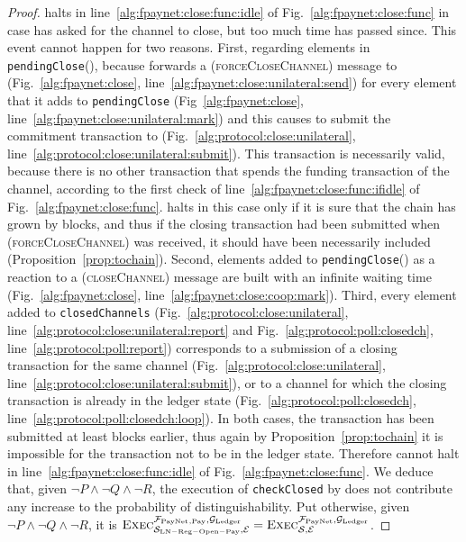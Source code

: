 \begin{proof}
  \fpaynet{} halts in line~\ref{alg:fpaynet:close:func:idle} of
  Fig.~\ref{alg:fpaynet:close:func} in case \environment{} has asked for the
  channel to close, but too much time has passed since. This event cannot happen
  for two reasons. First, regarding elements in \texttt{pendingClose}(\alice),
  because \fpaynet{} forwards a (\textsc{forceCloseChannel}) message to
  \simulator{} (Fig.~\ref{alg:fpaynet:close},
  line~\ref{alg:fpaynet:close:unilateral:send}) for every element that it adds
  to \texttt{pendingClose} (Fig~\ref{alg:fpaynet:close},
  line~\ref{alg:fpaynet:close:unilateral:mark}) and this causes \simulator{} to
  submit the commitment transaction to \ledger{}
  (Fig.~\ref{alg:protocol:close:unilateral},
  line~\ref{alg:protocol:close:unilateral:submit}). This transaction is
  necessarily valid, because there is no other transaction that spends the
  funding transaction of the channel, according to the first check of
  line~\ref{alg:fpaynet:close:func:ifidle} of Fig.~\ref{alg:fpaynet:close:func}.
  \fpaynet{} halts in this case only if it is sure that the chain has grown by
  \tochain{} blocks, and thus if the closing transaction had been submitted when
  (\textsc{forceCloseChannel}) was received, it should have been necessarily
  included (Proposition~\ref{prop:tochain}). Second, elements added to
  \texttt{pendingClose}(\alice) as a reaction to a (\textsc{closeChannel})
  message are built with an infinite waiting time (Fig.~\ref{alg:fpaynet:close},
  line~\ref{alg:fpaynet:close:coop:mark}). Third, every element added to
  \texttt{closedChannels} (Fig.~\ref{alg:protocol:close:unilateral},
  line~\ref{alg:protocol:close:unilateral:report} and
  Fig.~\ref{alg:protocol:poll:closedch}, line~\ref{alg:protocol:poll:report})
  corresponds to a submission of a closing transaction for the same channel
  (Fig.~\ref{alg:protocol:close:unilateral},
  line~\ref{alg:protocol:close:unilateral:submit}), or to a channel for which
  the closing transaction is already in the ledger state
  (Fig.~\ref{alg:protocol:poll:closedch},
  line~\ref{alg:protocol:poll:closedch:loop}). In both cases, the transaction
  has been submitted at least \tochain{} blocks earlier, thus again by
  Proposition~\ref{prop:tochain} it is impossible for the transaction not to be
  in the ledger state. Therefore \fpaynet{} cannot halt in
  line~\ref{alg:fpaynet:close:func:idle} of Fig.~\ref{alg:fpaynet:close:func}.
  We deduce that, given $\neg P \wedge \neg Q \wedge \neg R$, the execution of
  \texttt{checkClosed} by \fpaynet{} does not contribute any increase to the
  probability of distinguishability. Put otherwise, given $\neg P \wedge \neg Q
  \wedge \neg R$, it is $\textsc{Exec}^{\mathcal{F}_{\mathrm{PayNet}}{}_{\mathrm{, Pay}},
  \mathcal{G}_{\mathrm{Ledger}}}_{\mathcal{S}_{\mathrm{LN - Reg - Open - Pay}}, \mathcal{E}} =
  \textsc{Exec}^{\mathcal{F}_{\mathrm{PayNet}}, \mathcal{G}_{\mathrm{Ledger}}}_{\mathcal{S}, \mathcal{E}}$.


\end{proof}
